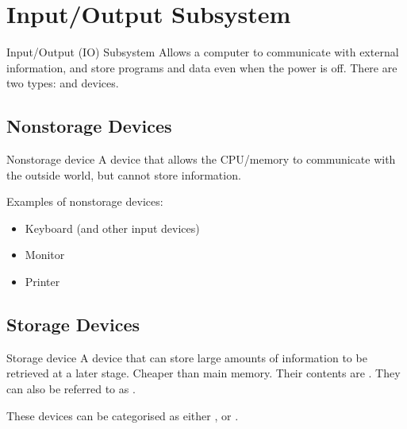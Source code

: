 \documentclass[../notes.tex]{subfiles}
\begin{document}
		\section{Input/Output Subsystem}
			\begin{definition}{Input/Output (IO) Subsystem}
				Allows a computer to communicate with external information, and store programs and data even when the power is off. There are two types:  and  devices.
			\end{definition}
			\subsection{Nonstorage Devices}
				\begin{definition}{Nonstorage device}
					A device that allows the CPU/memory to communicate with the outside world, but cannot store information.
				\end{definition}
				Examples of nonstorage devices:
				\begin{itemize}
					\item Keyboard (and other input devices)
					\item Monitor
					\item Printer
				\end{itemize}
			\subsection{Storage Devices}
				\begin{definition}{Storage device}
					A device that can store large amounts of information to be retrieved at a later stage. Cheaper than main memory. Their contents are . They can also be referred to as .
				\end{definition}
				These devices can be categorised as either , or .
\end{document}

